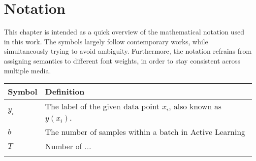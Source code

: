 \chapter*{Notation}
\label{ch:notation}


This chapter is intended as a quick overview of the mathematical notation used in this work.
The symbols largely follow contemporary works, while simultaneously trying to avoid ambiguity.
Furthermore, the notation refrains from assigning semantics to different font weights, in order to stay consistent across multiple media.

\begin{tabularx}{\textwidth}{l X}
    \toprule
    Symbol & Definition \\
    \midrule
    $y_i$ & The label of the given data point $x_i$, also known as $y(x_i)$. \\ \addlinespace
    $b$ & The number of samples within a batch in Active Learning \\ \addlinespace
    $T$ & Number of ... \\ \addlinespace
    \bottomrule
\end{tabularx}
\label{tab:notation}